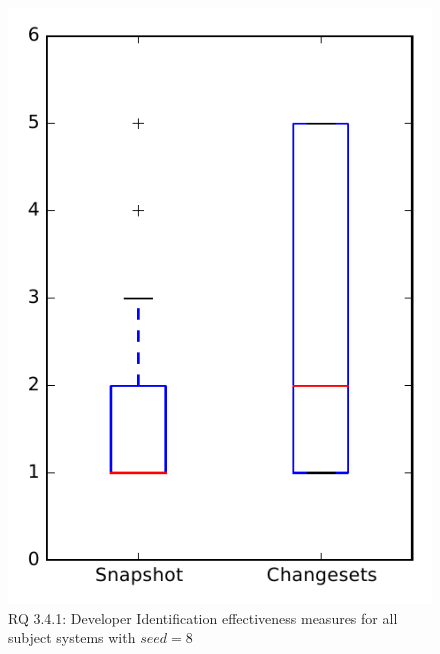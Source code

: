
\begin{figure}
\centering
\includegraphics[height=0.4\textheight]{figures/dit_seed/rq1_overview_8}
\caption{RQ 3.4.1: Developer Identification effectiveness measures for all subject systems with $seed=8$}
\label{fig:dit_seed:rq1:overview}
\end{figure}
